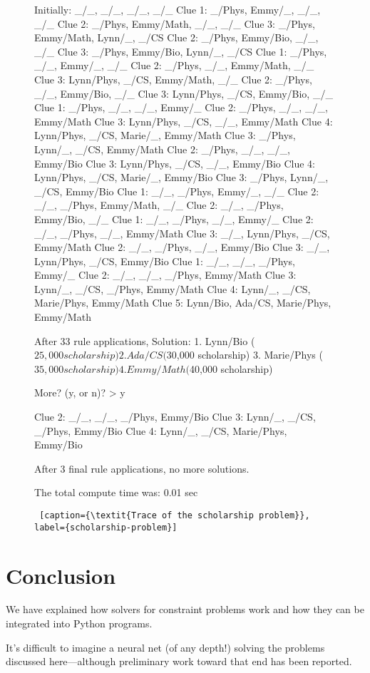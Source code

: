 \begin{figure}[ht]
    \flushright
\begin{minipage}[c]{0.45\textwidth}
\begin{python1}
Initially: _/_, _/_, _/_, _/_
Clue 1: _/Phys, Emmy/_, _/_, _/_
Clue 2: _/Phys, Emmy/Math, _/_, _/_
Clue 3: _/Phys, Emmy/Math, Lynn/_, _/CS
Clue 2: _/Phys, Emmy/Bio, _/_, _/_
Clue 3: _/Phys, Emmy/Bio, Lynn/_, _/CS
Clue 1: _/Phys, _/_, Emmy/_, _/_
Clue 2: _/Phys, _/_, Emmy/Math, _/_
Clue 3: Lynn/Phys, _/CS, Emmy/Math, _/_
Clue 2: _/Phys, _/_, Emmy/Bio, _/_
Clue 3: Lynn/Phys, _/CS, Emmy/Bio, _/_
Clue 1: _/Phys, _/_, _/_, Emmy/_
Clue 2: _/Phys, _/_, _/_, Emmy/Math
Clue 3: Lynn/Phys, _/CS, _/_, Emmy/Math
Clue 4: Lynn/Phys, _/CS, Marie/_, Emmy/Math
Clue 3: _/Phys, Lynn/_, _/CS, Emmy/Math
Clue 2: _/Phys, _/_, _/_, Emmy/Bio
Clue 3: Lynn/Phys, _/CS, _/_, Emmy/Bio
Clue 4: Lynn/Phys, _/CS, Marie/_, Emmy/Bio
Clue 3: _/Phys, Lynn/_, _/CS, Emmy/Bio
Clue 1: _/_, _/Phys, Emmy/_, _/_
Clue 2: _/_, _/Phys, Emmy/Math, _/_
Clue 2: _/_, _/Phys, Emmy/Bio, _/_
Clue 1: _/_, _/Phys, _/_, Emmy/_
Clue 2: _/_, _/Phys, _/_, Emmy/Math
Clue 3: _/_, Lynn/Phys, _/CS, Emmy/Math
Clue 2: _/_, _/Phys, _/_, Emmy/Bio
Clue 3: _/_, Lynn/Phys, _/CS, Emmy/Bio
Clue 1: _/_, _/_, _/Phys, Emmy/_
Clue 2: _/_, _/_, _/Phys, Emmy/Math
Clue 3: Lynn/_, _/CS, _/Phys, Emmy/Math
Clue 4: Lynn/_, _/CS, Marie/Phys, Emmy/Math
Clue 5: Lynn/Bio, Ada/CS, Marie/Phys, Emmy/Math

After 33 rule applications,
Solution: 
	1. Lynn/Bio	($25,000 scholarship)
	2. Ada/CS	($30,000 scholarship)
	3. Marie/Phys	($35,000 scholarship)
	4. Emmy/Math	($40,000 scholarship)

More? (y, or n)? > y

Clue 2: _/_, _/_, _/Phys, Emmy/Bio
Clue 3: Lynn/_, _/CS, _/Phys, Emmy/Bio
Clue 4: Lynn/_, _/CS, Marie/Phys, Emmy/Bio

After 3 final rule applications, no more solutions.

The total compute time was: 0.01 sec
\end{python1}\linv
\begin{lstlisting} [caption={\textit{Trace of the scholarship problem}}, label={scholarship-problem}]
\end{lstlisting}
\end{minipage}
\end{figure}


\section{Conclusion} \label{sec:conclusion}

We have explained how solvers for constraint problems work and how they can be integrated into Python programs. 

It's difficult to imagine a neural net (of any depth!) solving the problems discussed here---although preliminary work toward that end has been reported. \cite{xu2018towards, amel2019shallow, dubois2019towards}


